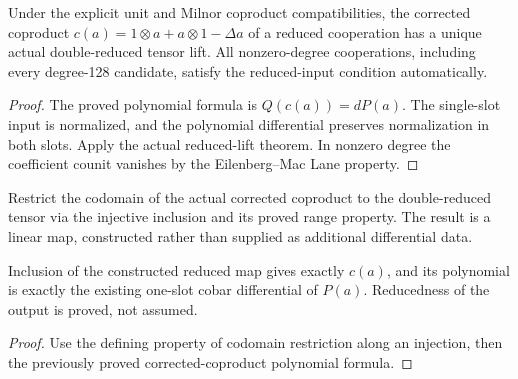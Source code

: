 \begin{proposition}
  \label{prop:h6-corrected-coproduct-double-reduced}
  \leanok
  Under the explicit unit and Milnor coproduct compatibilities, the
  corrected coproduct $c(a)=1\otimes a+a\otimes1-\Delta a$ of a reduced
  cooperation has a unique actual double-reduced tensor lift. All
  nonzero-degree cooperations, including every degree-128 candidate,
  satisfy the reduced-input condition automatically.
\end{proposition}
\begin{proof}
  The proved polynomial formula is $Q(c(a))=dP(a)$. The single-slot input
  is normalized, and the polynomial differential preserves normalization
  in both slots. Apply the actual reduced-lift theorem. In nonzero degree
  the coefficient counit vanishes by the Eilenberg--Mac Lane property.
  \leanok
\end{proof}

\begin{definition}
  \label{def:h6-reduced-coproduct-map}
  \leanok
  Restrict the codomain of the actual corrected coproduct to the
  double-reduced tensor via the injective inclusion and its proved
  range property. The result is a linear map, constructed rather than
  supplied as additional differential data.
\end{definition}

\begin{proposition}
  \label{prop:h6-reduced-coproduct-map}
  \leanok
  Inclusion of the constructed reduced map gives exactly $c(a)$, and
  its polynomial is exactly the existing one-slot cobar differential
  of $P(a)$. Reducedness of the output is proved, not assumed.
\end{proposition}
\begin{proof}
  Use the defining property of codomain restriction along an injection,
  then the previously proved corrected-coproduct polynomial formula.
  \leanok
\end{proof}

